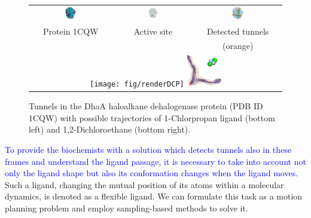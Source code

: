 \documentclass[usletter, 10pt, conference]{ieeeconf} %
\begin{document}
\begin{figure}[t]
\centering
{\footnotesize
\renewcommand{\arraystretch}{-0.5}
\renewcommand{\tabcolsep}{-1pt}
\begin{tabular}{ccc}
\includegraphics[width=0.14\textwidth]{fig/motiv1} &
\includegraphics[width=0.15\textwidth]{fig/motiv2lab} &
\includegraphics[width=0.14\textwidth]{fig/motiv3}  \\
Protein 1CQW & Active site & Detected tunnels \\ %
             &            & (orange)         \\  %
\multicolumn{3}{c}{%
\texttt{[image: fig/renderDCP]}  \hskip 15pt
\includegraphics[width=0.14\textwidth]{fig/render37t}} \\ 
\end{tabular}
}
\caption{\label{fig::motiv}
    \small
    Tunnels in the DhaA haloalkane dehalogenase protein (PDB ID 1CQW) with possible trajectories of 1-Chlorpropan ligand (bottom left) and 1,2-Dichloroethane (bottom right).
}
\end{figure}

\textcolor{blue}{To provide the biochemists with a solution which detects tunnels also in these frames and understand the ligand passage, it is necessary to take into account not only the ligand shape but also its conformation changes when the ligand moves.}
Such a ligand, changing the mutual position of its atoms within a molecular dynamics, is denoted as a flexible ligand.
We can formulate this task as a motion planning problem and employ sampling-based methods to solve it.
\end{document}
